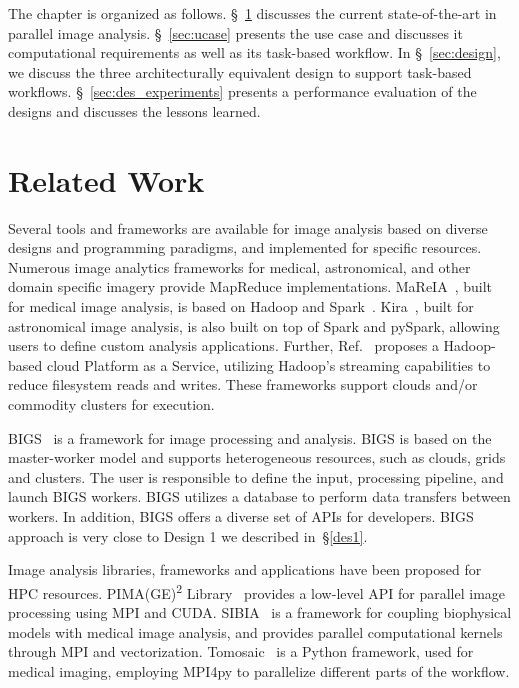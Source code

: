The chapter is organized as follows. \S~\ref{sec:des_rw} discusses the current
state-of-the-art in parallel image analysis. \S~\ref{sec:ucase} presents the use 
case and discusses it computational requirements as well as its task-based 
workflow. In \S~\ref{sec:design}, we discuss the three architecturally 
equivalent design to support task-based workflows. \S~\ref{sec:des_experiments} 
presents a performance evaluation of the designs and discusses the lessons 
learned.
 
\section{Related Work}
\label{sec:des_rw}
Several tools and frameworks are available for image analysis based on diverse 
designs and programming paradigms, and implemented for specific resources.
Numerous image analytics frameworks for medical, astronomical, and other 
domain specific imagery provide MapReduce implementations.
MaReIA~\cite{vo2018mareia}, built for medical image analysis, is based on 
Hadoop and Spark~\cite{zaharia2010spark}. Kira~\cite{zhang2016kira}, built for 
astronomical image analysis, is also built on top of Spark and pySpark, 
allowing users to define custom analysis applications. Further, 
Ref.~\cite{yan2014large} proposes a Hadoop-based cloud Platform as a Service, 
utilizing Hadoop's streaming capabilities to reduce filesystem reads and 
writes. These frameworks support clouds and/or commodity clusters for 
execution.
 
BIGS~\cite{ramos2012bigs} is a framework for image processing and analysis.
BIGS is based on the master-worker model and supports heterogeneous resources, 
such as clouds, grids and clusters. The user is responsible to define the 
input, processing pipeline, and launch BIGS workers. BIGS utilizes a database 
to perform data transfers between workers. In addition, BIGS offers a diverse 
set of APIs for developers. BIGS approach is very close to Design 1 we 
described in~\S\ref{des1}.

Image analysis libraries, frameworks and applications have been proposed for 
HPC resources. PIMA(GE)\textsuperscript{2} Library~\cite{galizia2015mpicuda} 
provides a low-level API for parallel image processing using MPI and CUDA.
SIBIA~\cite{gholami2017framework} is a framework for coupling biophysical 
models with medical image analysis, and provides parallel computational 
kernels through MPI and vectorization. Tomosaic~\cite{vescovi2018tomosaic} is 
a Python framework, used for medical imaging, employing MPI4py to parallelize 
different parts of the workflow.
 
